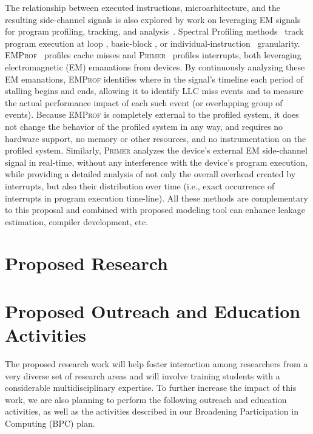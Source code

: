 \documentclass[11 pt]{article}
\begin{document}
The relationship between executed instructions, microarhitecture, and the resulting side-channel signals is also explored by work on leveraging EM signals for program profiling, tracking, and analysis~\cite{7783762,Gorman:2017:AON:3123939.3123973,Elvan2021,Zop, Zop2,Moumita2018,Moumita2022}. Spectral Profiling methods~\cite{7783762,Zop,Zop2,Elvan2021} track program execution at loop \cite{7783762}, basic-block \cite{Zop,Zop2}, or individual-instruction~\cite{Elvan2021} granularity.
\textsc{EMProf}~\cite{Moumita2018} profiles cache misses and \textsc{Primer}~\cite{Moumita2022} profiles interrupts, both leveraging electromagnetic (EM) emanations from devices. By continuously analyzing these EM emanations, \textsc{EMProf} identifies where in the signal's timeline each period of stalling begins and ends, allowing it to identify LLC miss events and to measure the actual performance impact of each such event (or overlapping group of events). Because \textsc{EMProf} is completely external to the profiled system, it does not change the behavior of the profiled system in any way, and requires no hardware support, no memory or other resources, and no instrumentation on the profiled system. Similarly, \textsc{Primer} analyzes the device's external EM side-channel signal in real-time, without any interference with the device's program execution, while providing a detailed analysis of not only the overall overhead created by interrupts, but also their distribution over time (i.e., exact occurrence of interrupts in program execution time-line). All these methods are complementary to this proposal and combined with proposed modeling tool can enhance leakage estimation, compiler development, etc.

\section{Proposed Research}
\label{sec:proposed}



\section{Proposed Outreach and Education Activities}

The proposed research work will help foster interaction among researchers from a
very diverse set of research areas and will involve training students
with a considerable multidisciplinary expertise. To further increase
the impact of this work, we are also planning to perform the following
outreach and education activities, as well as the activities described in our Broadening Participation in Computing (BPC) plan.
\end{document}
